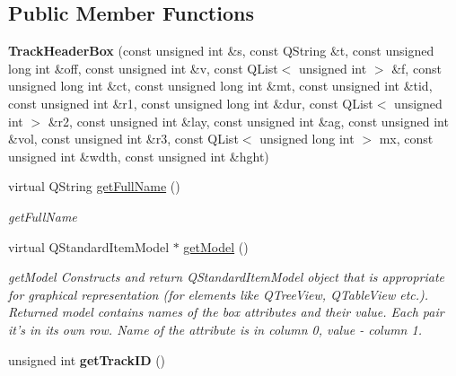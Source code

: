 \subsection*{Public Member Functions}
\begin{DoxyCompactItemize}
\item 
\hypertarget{class_track_header_box_aee3983e2ddc07cb5e329a08855cdff7c}{{\bfseries Track\-Header\-Box} (const unsigned int \&s, const Q\-String \&t, const unsigned long int \&off, const unsigned int \&v, const Q\-List$<$ unsigned int $>$ \&f, const unsigned long int \&ct, const unsigned long int \&mt, const unsigned int \&tid, const unsigned int \&r1, const unsigned long int \&dur, const Q\-List$<$ unsigned int $>$ \&r2, const unsigned int \&lay, const unsigned int \&ag, const unsigned int \&vol, const unsigned int \&r3, const Q\-List$<$ unsigned long int $>$ mx, const unsigned int \&wdth, const unsigned int \&hght)}\label{class_track_header_box_aee3983e2ddc07cb5e329a08855cdff7c}

\item 
virtual Q\-String \hyperlink{class_track_header_box_a7bc710a767026e2128ae46a1d3302778}{get\-Full\-Name} ()
\begin{DoxyCompactList}\small\item\em get\-Full\-Name \end{DoxyCompactList}\item 
virtual Q\-Standard\-Item\-Model $\ast$ \hyperlink{class_track_header_box_a59393dc4fe8791f266666f8f64efc510}{get\-Model} ()
\begin{DoxyCompactList}\small\item\em get\-Model Constructs and return Q\-Standard\-Item\-Model object that is appropriate for graphical representation (for elements like Q\-Tree\-View, Q\-Table\-View etc.). Returned model contains names of the box attributes and their value. Each pair it's in its own row. Name of the attribute is in column 0, value -\/ column 1. \end{DoxyCompactList}\item 
\hypertarget{class_track_header_box_a4a02fb3c9293a488aea1764c2fbd63ea}{unsigned int {\bfseries get\-Track\-I\-D} ()}\label{class_track_header_box_a4a02fb3c9293a488aea1764c2fbd63ea}

\end{DoxyCompactItemize}
